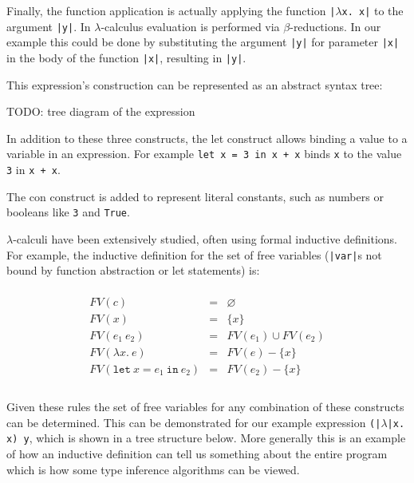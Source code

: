 \documentclass[a4paper,fleqn,oneside,12pt]{report}
\begin{document}
Finally, the function application is actually applying the function \texttt{|$\lambda$x. x|} to the argument \texttt{|y|}. In $\lambda$-calculus evaluation is performed via $\beta$-reductions. In our example this could be done by substituting the argument \texttt{|y|} for parameter \texttt{|x|} in the body of the function \texttt{|x|}, resulting in \texttt{|y|}.

This expression’s construction can be represented as an abstract syntax tree:

TODO: tree diagram of the expression

In addition to these three constructs, the let construct allows binding a value to a variable in an expression. For example \texttt{let x = 3 in x + x} binds \texttt{x} to the value \texttt{3} in \texttt{x + x}.

The con construct is added to represent literal constants, such as numbers or booleans like \texttt{3} and \texttt{True}.

$\lambda$-calculi have been extensively studied, often using formal inductive definitions. For example, the inductive definition for the set of free variables (\texttt{|var|}s not bound by function abstraction or let statements) is:

$$\begin{array}{lcl}
  \\
    FV(c)                                       & = & \varnothing\\
    FV(x)                                       & = & \{ x \}\\
    FV(e_1\ e_2)                                & = & FV(e_1) \cup FV(e_2)\\
    FV(\lambda x.\ e  )                         & = & FV(e) - \{ x \}\\
    FV(\mathtt{let}\ x = e_1\ \mathtt{in}\ e_2) & = & FV(e_2) - \{ x \}\\
  \\
\end{array}$$

Given these rules the set of free variables for any combination of these constructs can be determined. This can be demonstrated for our example expression \texttt{(|$\lambda$|x. x) y}, which is shown in a tree structure below. More generally this is an example of how an inductive definition can tell us something about the entire program which is how some type inference algorithms can be viewed.
\end{document}
